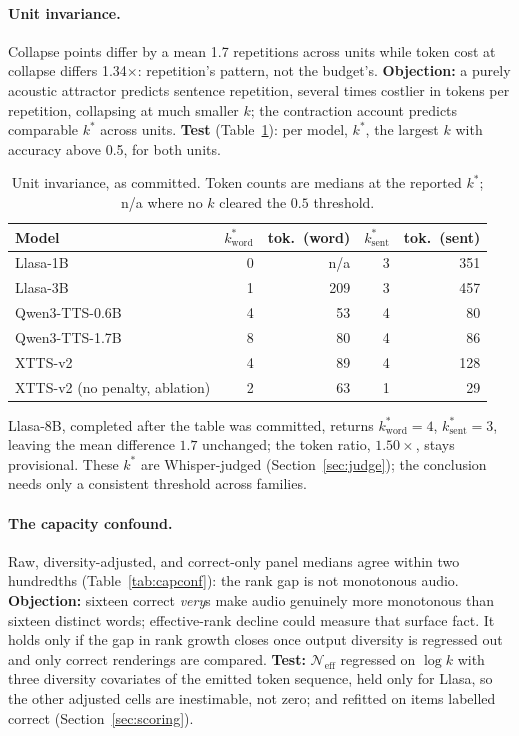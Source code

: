 \paragraph{Unit invariance.} Collapse points differ by a mean 1.7 repetitions across units while
token cost at collapse differs 1.34$\times$: repetition's pattern, not the budget's.
\textbf{Objection:} a purely acoustic attractor predicts sentence repetition, several times
costlier in tokens per repetition, collapsing at much smaller $k$; the contraction account
predicts comparable $k^\ast$ across units. \textbf{Test} (Table~\ref{tab:unitinv}): per model,
$k^\ast$, the largest $k$ with accuracy above 0.5, for both units.

\begin{table}[tp]
\centering
\caption{Unit invariance, as committed. Token counts are medians at the reported $k^\ast$; n/a where no
$k$ cleared the $0.5$ threshold.}
\label{tab:unitinv}
\small
\begin{tabular}{@{}lrrrr@{}}
\toprule
Model & $k^\ast_{\mathrm{word}}$ & tok.\ (word) & $k^\ast_{\mathrm{sent}}$ & tok.\ (sent) \\
\midrule
Llasa-1B & 0 & n/a & 3 & 351 \\
Llasa-3B & 1 & 209 & 3 & 457 \\
Qwen3-TTS-0.6B & 4 & 53 & 4 & 80 \\
Qwen3-TTS-1.7B & 8 & 80 & 4 & 86 \\
XTTS-v2 & 4 & 89 & 4 & 128 \\
XTTS-v2 (no penalty, ablation) & 2 & 63 & 1 & 29 \\
\bottomrule
\end{tabular}
\end{table}

\noindent Llasa-8B, completed after the table was committed, returns
$k^\ast_{\mathrm{word}}{=}4$, $k^\ast_{\mathrm{sent}}{=}3$, leaving the
mean difference $1.7$ unchanged; the token ratio, $1.50\times$, stays
provisional. These $k^\ast$ are Whisper-judged
(Section~\ref{sec:judge}); the conclusion needs only a consistent
threshold across families.

\paragraph{The capacity confound.} Raw, diversity-adjusted, and correct-only panel medians agree
within two hundredths (Table~\ref{tab:capconf}): the rank gap is not monotonous audio.
\textbf{Objection:} sixteen correct \emph{very}s make audio genuinely more monotonous than
sixteen distinct words; effective-rank decline could measure that surface fact. It holds only
if the gap in rank growth closes once output diversity is regressed out and only correct
renderings are compared. \textbf{Test:}
$\mathcal{N}_{\mathrm{eff}}$ regressed on $\log k$ with three diversity covariates of the
emitted token sequence, held only for Llasa, so the other adjusted cells are inestimable, not
zero; and refitted on items labelled correct (Section~\ref{sec:scoring}).

